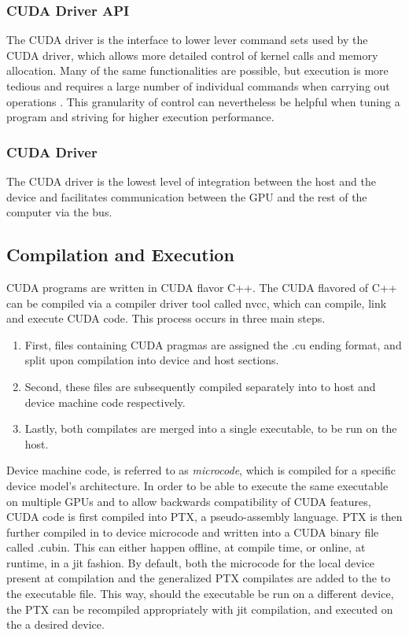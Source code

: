 \subsubsection{CUDA Driver API}
The CUDA driver is the interface to lower lever command sets used by the CUDA driver, which allows more detailed control
of kernel calls and memory allocation. Many of the same functionalities are possible,
but execution is more tedious and requires a large number of individual commands
when carrying out operations \cite{driver}. This granularity of control can nevertheless be
helpful when tuning a program and striving for higher execution performance.
\subsubsection{CUDA Driver}

The CUDA driver is the lowest level of integration between the host and the device
and facilitates communication between the \Gls{GPU} and the rest of the computer via the bus. %


\subsection{Compilation and Execution}


CUDA programs are written in CUDA flavor C++.  The CUDA flavored of C++
can be compiled via a compiler driver tool called nvcc, which can compile, link and execute CUDA code.  This process occurs
 in three main steps.
 \begin{enumerate}

\item First,
files containing CUDA pragmas are assigned the .cu ending format, and split upon
compilation into device and host sections.
\item Second, these files are subsequently
compiled separately into to host and device machine code respectively.
\item Lastly, both compilates are merged into a single executable, to be run on the host.
\end{enumerate}
\par
Device machine code, is referred to as  \textit{microcode},
which is compiled for a specific device model's architecture. In order to be able
to execute the same executable
on multiple \Glspl{GPU} and to allow backwards compatibility of CUDA features, CUDA code is
first compiled into \Gls{PTX}, a pseudo-assembly language.  \Gls{PTX} is then
further compiled in to device microcode and written into a CUDA binary file called .cubin.
This can either happen offline, at compile time,
or online, at runtime, in a \gls{jit} fashion.  By default, both
the microcode for the local device present at compilation and the generalized
\gls{PTX} compilates are added to the to the executable file.
This way, should the executable be run on a different device, the \gls{PTX} can
be recompiled appropriately with \Gls{jit} compilation, and executed on the a
desired device\cite{Wilt}.

